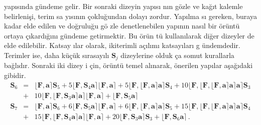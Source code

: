 \documentclass[a4paper,10pt]{article}
\begin{document}
yap\i s\i nda g\"undeme gelir. Bir sonraki di\-zeyin yap{\i}s{\i}%
n{\i}n g\"ozle ve ka\u{g}\i t kalemle be\-lirleni\c{s}i, terim sa%
y\i s\i n\i n \c{c}oklu\u{g}undan dolay{\i} zor\-dur. Ya\-p\i lma%
s{\i} gereken, buraya kadar elde edilen ve do\u{g}rulu\u{g}u g\"o%
zle denetlenebilen yap\i n\i n nas\i l bir \"or\"unt\"u or\-taya %
\c{c}\i kard\i \u{g}\i n{\i} g\"undeme getirmektir. Bu \"o\-r\"un%
t\"u kullan\i larak di\u{g}er dizeyler de elde edilebilir. Katsay%
\i lar olarak, ikiterimli a\c{c}\i l\i m{\i} kat\-say\i lar{\i} g%
\"undemdedir. Terimler ise, daha k\"u\c{c}\"uk s\i rasay\i l{\i} %
$\mathbf{S}_{j}$ dizey\-leri\-ne ol\-duk%
\c{c}a somut kurallarla ba\u{g}l\i d\i r. Son\-ra\-ki iki dizey i%
\c{c}in, \"or\"unt\"u temel al\i narak, \"o\-ne\-rilen yap\i lar %
a\c{s}a\u{g}\i daki gibidir. %
\begin{eqnarray}
 \mathbf{S}_{6} &=&
 \lfloor \mathbf{F} , \mathbf{a} \rceil
 \mathbf{S}_{5}
 + 5 \lfloor \mathbf{F} , \mathbf{S}_{4}\mathbf{a} \rceil
 \lfloor \mathbf{F} , \mathbf{a} \rceil 
 + 5 \lfloor \mathbf{F} , \lfloor \mathbf{F} , 
 \mathbf{a} \rceil \mathbf{a} \rceil
 \mathbf{S}_{4}
 + 10  \lfloor \mathbf{F} ,  \lfloor \mathbf{F} , 
 \lfloor \mathbf{F} 
 , \mathbf{a} \rceil \mathbf{a} \rceil \mathbf{a} \rceil 
 \mathbf{S}_{3} \nonumber\\
 &+& 10  \lfloor \mathbf{F} ,  \lfloor \mathbf{F} , 
 \mathbf{S}_{3}\mathbf{a} 
 \rceil\mathbf{a} \rceil 
 \lfloor \mathbf{F} , \mathbf{a} \rceil
 +  \lfloor \mathbf{F} ,  
 \mathbf{S}_{5}\mathbf{a} \rceil
\label{eq:dd6}
\end{eqnarray}
\begin{eqnarray}
 \mathbf{S}_{7} &=&
 \lfloor \mathbf{F} , \mathbf{a} \rceil
 \mathbf{S}_{6}
 + 6 \lfloor \mathbf{F} , 
 \mathbf{S}_{5}\mathbf{a} \rceil
 \lfloor \mathbf{F} , \mathbf{a} \rceil 
 + 6 \lfloor \mathbf{F} , 
 \lfloor \mathbf{F} , \mathbf{a} \rceil \mathbf{a} \rceil
 \mathbf{S}_{5}
 + 15  \lfloor \mathbf{F} ,  
 \lfloor \mathbf{F} , \lfloor \mathbf{F} 
 , \mathbf{a} \rceil \mathbf{a} \rceil \mathbf{a} \rceil 
 \mathbf{S}_{4} \nonumber\\
 &+& 15  \lfloor \mathbf{F} ,  
 \lfloor \mathbf{F} , 
 \mathbf{S}_{4}\mathbf{a} 
 \rceil\mathbf{a} \rceil 
 \lfloor \mathbf{F} , \mathbf{a} \rceil
 + 20 \lfloor \mathbf{F} , 
 \mathbf{S}_{3}\mathbf{a} \rceil
 \mathbf{S}_{3}
 +  \lfloor \mathbf{F} , 
 \mathbf{S}_{6}\mathbf{a} \rceil \, .
 \label{eq:dd7}
\end{eqnarray}
\end{document}
